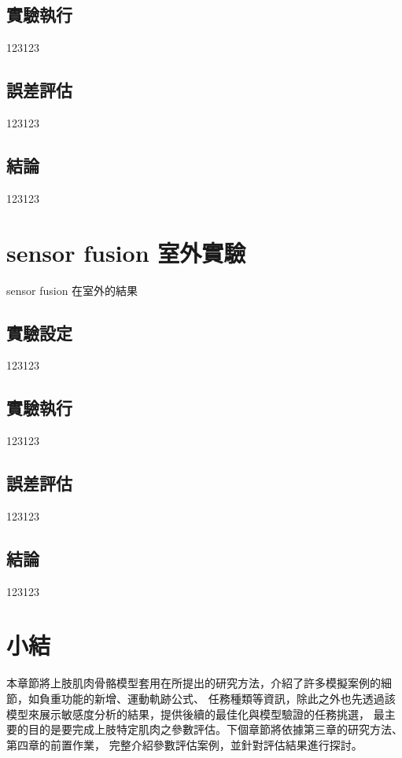 \subsection{實驗執行}
123123
\subsection{誤差評估}
123123
\subsection{結論}
123123

\section{sensor fusion 室外實驗}
sensor fusion 在室外的結果
\subsection{實驗設定}
123123
\subsection{實驗執行}
123123
\subsection{誤差評估}
123123
\subsection{結論}
123123

\section{小結}
本章節將上肢肌肉骨骼模型套用在所提出的研究方法，介紹了許多模擬案例的細節，如負重功能的新增、運動軌跡公式、
任務種類等資訊，除此之外也先透過該模型來展示敏感度分析的結果，提供後續的最佳化與模型驗證的任務挑選，
最主要的目的是要完成上肢特定肌肉之參數評估。下個章節將依據第三章的研究方法、第四章的前置作業，
完整介紹參數評估案例，並針對評估結果進行探討。

\clearpage